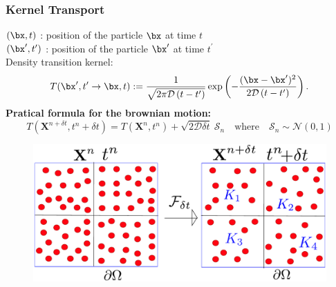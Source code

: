 \documentclass[10 pt]{beamer}
\begin{document}
\begin{frame}
  \frametitle{Kernel Transport}
  $(\bx,t)$ : position of the particle $\bx$ at time $t$
  \\
  \vspace*{0.2 cm}
  $(\bx^{\prime},t^{\prime})$ : position of the particle $\bx^{\prime}$ at time $t^{\prime}$\\
  \vspace*{0.2 cm}
  Density transition kernel:
  \begin{equation*}
    T(\bx^{\prime},t^{\prime} \rightarrow \bx,t) :=
    \frac{1}{\sqrt{2 \pi \mathcal{D} \left(t-t^{\prime}\right)}}
    \exp \left(-\frac{(\bx-\bx^{\prime})^2}{2 \mathcal{D} \left(t-t^{\prime}\right)}\right).
  \end{equation*}
  \textcolor{cadmiumgreen}{\textbf{Pratical formula for the brownian motion:}}
  \begin{equation*}
T({\bm X}^{n+\delta t}, t^{n} + \delta t) = T({\bm X}^{n},t^{n}) + \sqrt{2 \mathcal{D} \delta t} \ \mathcal{S}_n \quad \text{where} \quad \mathcal{S}_n \sim \mathcal{N}(0,1)
    \end{equation*}
  \begin{figure}
    \centering
\includegraphics[scale=0.38]{image/Sampling_2D-cropped}
    \end{figure}
\end{frame}
%
\end{document}

